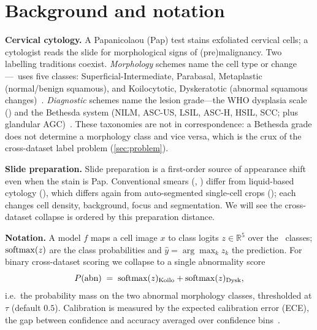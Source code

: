 \section{Background and notation}
\label{sec:primer}

\noindent\textbf{Cervical cytology.} A Papanicolaou (Pap) test stains exfoliated cervical cells;
a cytologist reads the slide for morphological signs of (pre)malignancy. Two labelling traditions
coexist. \emph{Morphology} schemes name the cell type or change---\sipakmed\ uses five classes:
Superficial-Intermediate, Parabasal, Metaplastic (normal/benign squamous), and Koilocytotic,
Dyskeratotic (abnormal squamous changes)~\cite{plissiti2018sipakmed}. \emph{Diagnostic} schemes name
the lesion grade---the WHO dysplasia scale (\herlev) and the Bethesda system (NILM, ASC-US, LSIL,
ASC-H, HSIL, SCC; plus glandular AGC)~\cite{nayar2015bethesda}. These taxonomies are not in
correspondence: a Bethesda grade does not determine a morphology class and vice versa, which is the
crux of the cross-dataset label problem (\cref{sec:problem}).

\noindent\textbf{Slide preparation.} Slide preparation is a first-order source of appearance shift
even when the stain is Pap. Conventional smears (\sipakmed, \herlev) differ from liquid-based cytology
(\hicervix), which differs again from auto-segmented single-cell crops (\apacc); each changes cell
density, background, focus and segmentation. We will see the cross-dataset collapse is ordered by this
preparation distance.

\noindent\textbf{Notation.} A model $f$ maps a cell image $x$ to class logits $z\in\mathbb{R}^5$ over
the \sipakmed\ classes; $\operatorname{softmax}(z)$ are the class probabilities and $\hat{y}=\arg\max_k z_k$ the
prediction. For binary cross-dataset scoring we collapse to a single abnormality score
\begin{equation}
P(\mathrm{abn}) \;=\; \operatorname{softmax}(z)_{\mathrm{Koilo}} + \operatorname{softmax}(z)_{\mathrm{Dysk}},
\label{eq:pabn}
\end{equation}
i.e.\ the probability mass on the two abnormal morphology classes, thresholded at $\tau$ (default
$0.5$). Calibration is measured by the expected calibration error (ECE), the gap between confidence
and accuracy averaged over confidence bins~\cite{guo2017calibration}.
